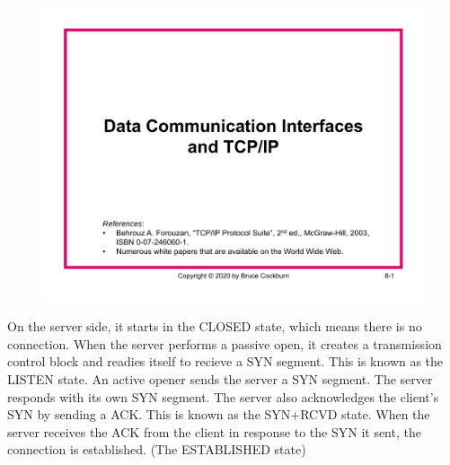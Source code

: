 \section{}
\begin{figure}[H]
  \centering
\includegraphics[page=40, width=\textwidth]{../../notes/Ch8_W20_TCP_IP.pdf}
\end{figure}

On the server side, it starts in the CLOSED state, which means there is no
connection. When the server performs a passive open, it creates a transmission
control block and readies itself to recieve a SYN segment. This is known as the
LISTEN state.
An active opener sends the server a SYN segment. The server responds
with its own SYN segment. The server also
acknowledges the client’s SYN by sending a ACK.
This is known as the SYN+RCVD state.
When the server
receives the ACK from the client in response to the SYN it sent, the
connection is established. (The ESTABLISHED state)

